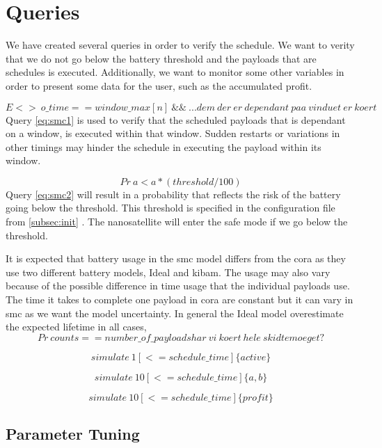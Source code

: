 \section{Queries}\label{sec:queries}
We have created several queries in order to verify the schedule. We want to verity that we do not go below the battery threshold and the payloads that are schedules is executed. Additionally, we want to monitor some other variables in order to present some data for the user, such as the accumulated profit.

\begin{equation} \label{eq:smc1}
	E<>\ o\_time == window\_max[n]\ \&\&\ ... dem\ der\ er\ dependant\ paa\ vinduet\ er\ koert
\end{equation}
Query \ref{eq:smc1} is used to verify that the scheduled payloads that is dependant on a window, is executed within that window. Sudden restarts or variations in other timings may hinder the schedule in executing the payload within its window. 

\begin{equation} \label{eq:smc2}
	Pr\ a < a*(threshold/100)
\end{equation}
Query \ref{eq:smc2} will result in a probability that reflects the risk of the battery going below the threshold. This threshold is specified in the configuration file from \cref{subsec:init} . The nanosatellite will enter the safe mode if we go below the threshold.

It is expected that battery usage in the \gls{smc} model differs from the \gls{cora} as they use two  different battery models, Ideal and \gls{kibam}. The usage may also vary because of the possible difference in time usage that the individual payloads use. The time it takes to complete one payload in \gls{cora} are constant but it can vary in \gls{smc} as we want the model uncertainty.
In general the Ideal model overestimate the expected lifetime in all cases, 
\begin{equation} \label{eq:smc3}
	Pr\ counts == number\_of\_payloads har\ vi\ koert\ hele\ skidtemoeget?
\end{equation}

\begin{equation} \label{eq:smc4}
	simulate\ 1 [<=schedule\_time] \{ active\}
\end{equation}

\begin{equation} \label{eq:smc5}
	simulate\ 10 [<=schedule\_time] \{ a, b\}
\end{equation}

\begin{equation} \label{eq:smc6}
	simulate\ 10 [<= schedule\_time] \{ profit \}
\end{equation}




\subsection{Parameter Tuning}